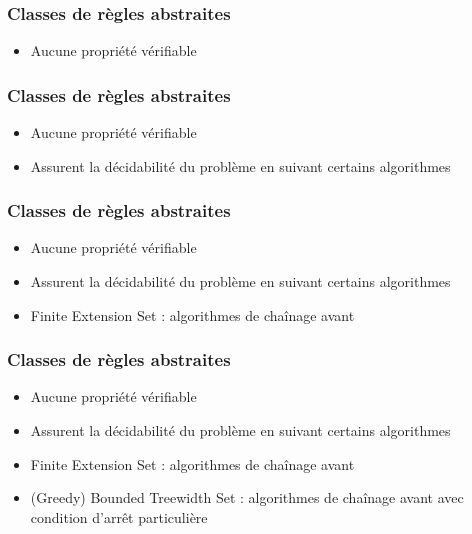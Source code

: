 
\begin{frame}[t]
	\frametitle{Classes de règles abstraites}
	\vspace{10mm}
	\begin{itemize}
		\item Aucune propriété vérifiable
	\end{itemize}
\end{frame}

\begin{frame}[t]
	\frametitle{Classes de règles abstraites}
	\vspace{10mm}
	\begin{itemize}
		\item Aucune propriété vérifiable
		\item Assurent la décidabilité du problème en suivant certains algorithmes
	\end{itemize}
\end{frame}

\begin{frame}[t]
	\frametitle{Classes de règles abstraites}
	\vspace{10mm}
	\begin{itemize}
		\item Aucune propriété vérifiable
		\item Assurent la décidabilité du problème en suivant certains algorithmes
		\item Finite Extension Set : algorithmes de chaînage avant
	\end{itemize}
\end{frame}

\begin{frame}[t]
	\frametitle{Classes de règles abstraites}
	\vspace{10mm}
	\begin{itemize}
		\item Aucune propriété vérifiable
		\item Assurent la décidabilité du problème en suivant certains algorithmes
		\item Finite Extension Set : algorithmes de chaînage avant
		\item (Greedy) Bounded Treewidth Set : algorithmes de chaînage avant avec condition
		d'arrêt particulière
	\end{itemize}
\end{frame}

